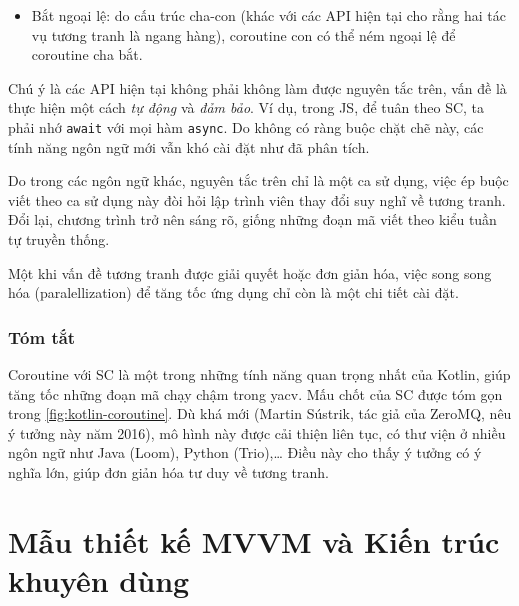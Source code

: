 \documentclass[../../thesis]{subfiles}
\begin{document}
\begin{itemize}[resume, before = \vspace*{-\dimexpr\topsep+\partopsep\relax}]
    \item
        Bắt ngoại lệ: do cấu trúc cha-con (khác với các API hiện tại cho rằng
        hai tác vụ tương tranh là ngang hàng), coroutine con có thể ném ngoại lệ
        để coroutine cha bắt.
\end{itemize}

Chú ý là các API hiện tại không phải không làm được nguyên tắc trên, vấn đề là
thực hiện một cách \emph{tự động} và \emph{đảm bảo}. Ví dụ, trong JS, để tuân
theo SC, ta phải nhớ \texttt{await} với mọi hàm \texttt{async}. Do không có ràng
buộc chặt chẽ này, các tính năng ngôn ngữ mới vẫn khó cài đặt như đã phân tích.

Do trong các ngôn ngữ khác, nguyên tắc trên chỉ là một ca sử dụng, việc ép buộc
viết theo ca sử dụng này đòi hỏi lập trình viên thay đổi suy nghĩ về tương
tranh. Đổi lại, chương trình trở nên sáng rõ, giống những đoạn mã viết theo kiểu
tuần tự truyền thống.

Một khi vấn đề tương tranh được giải quyết hoặc đơn giản hóa, việc song song hóa
(paralellization) để tăng tốc ứng dụng chỉ còn là một chi tiết cài đặt.

\subsubsection{Tóm tắt}

Coroutine với SC là một trong những tính năng quan trọng nhất của Kotlin, giúp
tăng tốc những đoạn mã chạy chậm trong yacv. Mấu chốt của SC được tóm gọn trong
\autoref{fig:kotlin-coroutine}. Dù khá mới (Martin Sústrik, tác giả của ZeroMQ,
nêu ý tưởng này năm 2016), mô hình này được cải thiện liên tục, có thư viện ở
nhiều ngôn ngữ như Java (Loom), Python (Trio),\ldots{} Điều này cho thấy ý tưởng
có ý nghĩa lớn, giúp đơn giản hóa tư duy về tương tranh.



\section{Mẫu thiết kế MVVM và Kiến trúc khuyên dùng}\label{sec:mvvm-app-arch}
\end{document}
